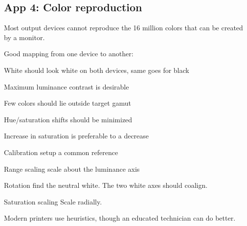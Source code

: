 \begin{mdframed}\begin{multicols}{2}
\subsection{App 4: Color reproduction}
    Most output devices cannot reproduce the 16 million colors that can be
    created by a monitor.


    Good mapping from one device to another:
\begin{compactenum}
    \item White should look white on both devices, same goes for black
    \item Maximum luminance contrast is desirable
    \item Few colors should lie outside target gamut
    \item Hue/saturation shifts should be minimized
    \item Increase in saturation is preferable to a decrease
\end{compactenum}
\begin{compactdesc}
    \item[Calibration] setup a common reference
    \item[Range scaling] scale about the luminance axis
    \item[Rotation] find the neutral white. The two white axes should coalign.
    \item[Saturation scaling] Scale radially.
    \item[Modern printers] use heuristics, though an educated technician can do
        better.
\end{compactdesc}
\end{multicols}\end{mdframed}



